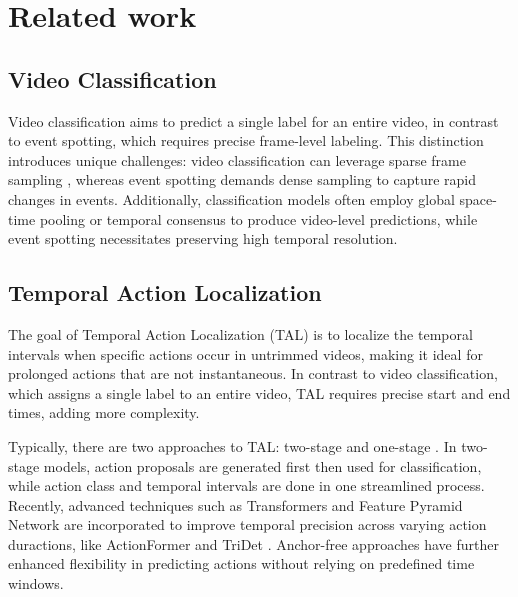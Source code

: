 \documentclass[conference]{IEEEtran}
\begin{document}


\section{Related work}

\subsection{Video Classification}

Video classification aims to predict a single label for an entire video, in contrast to event spotting, which requires precise frame-level labeling. This distinction introduces unique challenges: video classification can leverage sparse frame sampling \cite{tsn}, whereas event spotting demands dense sampling to capture rapid changes in events. Additionally, classification models often employ global space-time pooling \cite{8578773} or temporal consensus \cite{zhou2018temporalrelationalreasoningvideos} to produce video-level predictions, while event spotting necessitates preserving high temporal resolution.


\subsection{Temporal Action Localization}

The goal of Temporal Action Localization (TAL) is to localize the temporal intervals when specific actions occur in untrimmed videos, making it ideal for prolonged actions that are not instantaneous. In contrast to video classification, which assigns a single label to an entire video, TAL requires precise start and end times, adding more complexity.

Typically, there are two approaches to TAL: two-stage \cite{9578330,10.1007/978-3-319-46487-9_47} and one-stage \cite{10203543,zhang2022actionformer}. In two-stage models, action proposals are generated first then used for classification, while action class and temporal intervals are done in one streamlined process. Recently, advanced techniques such as Transformers and Feature Pyramid Network are incorporated to improve temporal precision across varying action duractions, like ActionFormer \cite{zhang2022actionformer} and TriDet \cite{tridet}. Anchor-free approaches \cite{9171561} have further enhanced flexibility in predicting actions without relying on predefined time windows.
\end{document}
